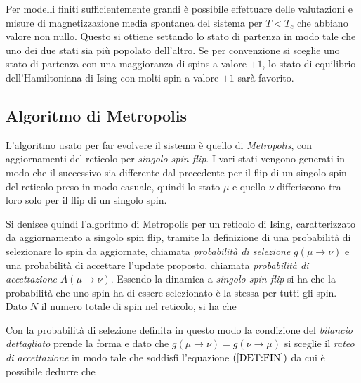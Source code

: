 \documentclass[a4paper,12pt]{article}
\begin{document}
Per modelli finiti sufficientemente grandi è possibile effettuare delle valutazioni e misure di magnetizzazione media spontanea del sistema per $T < T_c$ che abbiano valore non nullo. Questo si ottiene settando lo stato di partenza in modo tale che uno dei due stati sia più popolato dell’altro. Se per convenzione si sceglie uno stato di partenza con una maggioranza di spins a valore $+1$, lo stato di equilibrio dell’Hamiltoniana di Ising con molti spin a valore $+1$ sarà favorito. 

\subsection{Algoritmo di Metropolis}
L'algoritmo usato per far evolvere il sistema \`e quello di \emph{Metropolis}, con aggiornamenti del reticolo per \emph{singolo spin flip}. I vari stati vengono generati in modo che il successivo sia differente dal precedente per il flip di un singolo spin del reticolo preso in modo casuale, quindi lo stato $\mu$ e quello $\nu$ differiscono tra loro solo per il flip di un singolo spin. 

Si denisce quindi l'algoritmo di Metropolis per un reticolo di Ising, caratterizzato da aggiornamento a singolo spin flip, tramite la definizione di una probabilit\`a di selezionare lo spin da aggiornate, chiamata \emph{probabilit\`a di selezione} $g(\mu \to \nu)$ e una probabilit\`a di accettare l'update proposto, chiamata \emph{probabilit\`a di accettazione} $A(\mu \to \nu)$. Essendo la dinamica a \emph{singolo spin flip} si ha che la probabilit\`a che uno spin ha di essere selezionato \`e la stessa per tutti gli spin. Dato $N$ il numero totale di spin nel reticolo, si ha che

Con la probabilità di selezione definita in questo modo la condizione del \emph{bilancio dettagliato} prende la forma
e dato che $g(\mu\to\nu)=g(\nu\to\mu)$ si sceglie il \emph{rateo di accettazione} in modo tale che soddisfi l'equazione $(\ref{DET:FIN})$
da cui è possibile dedurre che
\end{document}
